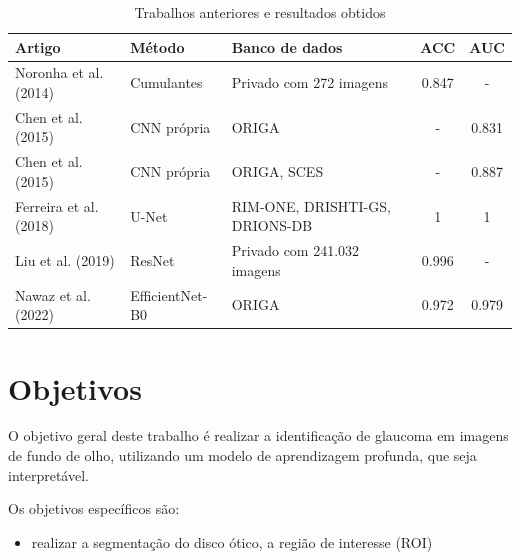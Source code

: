 \documentclass[12pt]{article}
\begin{document}
\begin{table}[htb]
    \centering
    \begin{tabular}{|l|l|p{3cm}|c|c|}
    \hline
    Artigo                                      & Método      & Banco de dados                 & ACC   & AUC   \\
    \hline
    Noronha et al. (2014) \cite{noronha2014hoc} & Cumulantes  & Privado com 272 imagens        & 0.847 &  -    \\
    \hline
    Chen et al. (2015) \cite{chen2015cnn}       & CNN própria & ORIGA                          & -     & 0.831 \\
    \hline
    Chen et al. (2015) \cite{chen2015cnn}       & CNN própria & ORIGA, SCES                    & -     & 0.887 \\
    \hline
    Ferreira et al. (2018) \cite{ferreira_cnn_2018} & U-Net   & RIM-ONE, DRISHTI-GS, DRIONS-DB & 1     & 1     \\
    \hline
    Liu et al. (2019) \cite{liu_cnn_2019}       & ResNet      & Privado com 241.032 imagens    & 0.996 & -     \\
    \hline
    Nawaz et al. (2022) \cite{nawaz_efficient_2022} & EfficientNet-B0 & ORIGA                  & 0.972 & 0.979 \\
    \hline
    \end{tabular}
    \caption{Trabalhos anteriores e resultados obtidos}
    \label{tab:trabalhos}
\end{table}

\bigskip

\section{Objetivos}
\label{sec:objetivo}

O objetivo geral deste trabalho é realizar a identificação de glaucoma em imagens de fundo de olho, utilizando um modelo de aprendizagem profunda, que seja interpretável.

Os objetivos específicos são:
\begin{itemize}
 \item realizar a segmentação do disco ótico, a região de interesse (ROI)
\end{itemize}
\end{document}
